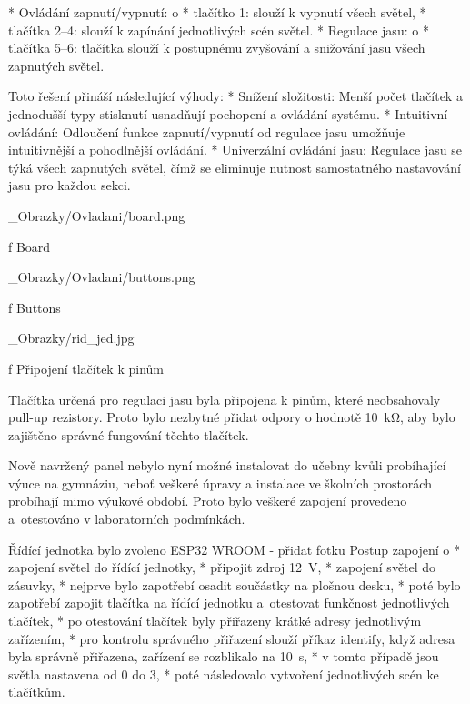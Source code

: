 \begitems
    * {\sbf Ovládání zapnutí/vypnutí:}
    \begitems \style o
        * {\sbf tlačítko 1:} slouží k vypnutí všech světel,
        * {\sbf tlačítka 2--4:} slouží k zapínání jednotlivých scén světel.
    \enditems
    * {\sbf Regulace jasu:}
        \begitems \style o
        * {\sbf tlačítka 5--6:}  tlačítka slouží k postupnému zvyšování a snižování jasu všech zapnutých světel.
        \enditems
\enditems

\medskip\noindent
Toto řešení přináší následující výhody:
\begitems
    * {\sbf Snížení složitosti:} Menší počet tlačítek a jednodušší typy stisknutí usnadňují pochopení a ovládání systému.
    * {\sbf Intuitivní ovládání:} Odloučení funkce zapnutí/vypnutí od regulace jasu umožňuje intuitivnější a pohodlnější ovládání.
    * {\sbf Univerzální ovládání jasu:} Regulace jasu se týká všech zapnutých světel, čímž se eliminuje nutnost samostatného nastavování jasu pro každou sekci.
\enditems

\medskip {}
\picw=10cm _Obrazky/Ovladani/board.png
\caption/f Board
\medskip

\medskip {}
\picw=10cm _Obrazky/Ovladani/buttons.png
\caption/f Buttons
\medskip

\medskip {}
\picw=10cm _Obrazky/rid_jed.jpg
\caption/f Připojení tlačítek k pinům
\medskip


Tlačítka určená pro regulaci jasu byla připojena k pinům, které neobsahovaly pull-up rezistory.
Proto bylo nezbytné přidat odpory o hodnotě 10~kΩ, aby bylo zajištěno správné fungování těchto tlačítek.

Nově navržený panel nebylo nyní možné instalovat do učebny kvůli probíhající výuce na gymnáziu, neboť veškeré úpravy
a instalace ve školních prostorách probíhají mimo výukové období. Proto bylo veškeré zapojení provedeno a~otestováno v laboratorních podmínkách.

\medskip
\noindent
Řídící jednotka bylo zvoleno ESP32 WROOM - přidat fotku
\noindent
{\sbf Postup zapojení}
\begitems \style o
* zapojení světel do řídící jednotky,
* připojit zdroj 12~V,
* zapojení světel do zásuvky,
* nejprve bylo zapotřebí osadit součástky na plošnou desku,
* poté bylo zapotřebí zapojit tlačítka na řídící jednotku a~otestovat funkčnost jednotlivých tlačítek,
* po otestování tlačítek byly přiřazeny krátké adresy jednotlivým zařízením,
* pro kontrolu správného přiřazení slouží příkaz identify, když adresa byla správně přiřazena, zařízení se rozblikalo na 10~s,
* v tomto případě jsou světla nastavena od 0 do 3,
* poté následovalo vytvoření jednotlivých scén ke tlačítkům.
\enditems

